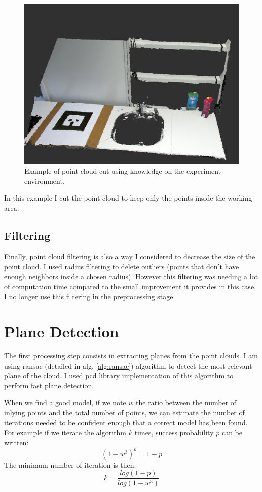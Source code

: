 \begin{figure}[h!]
\centering
\includegraphics[width=\textwidth]{images/cut.png}
\caption{Example of point cloud cut using knowledge on the experiment environment.}
\label{fig:cut}
\end{figure}

In this example I cut the point cloud to keep only the points inside the working area.

\subsection{Filtering}

Finally, point cloud filtering is also a way I considered to decrease the size of the point cloud. I used radius filtering to delete outliers (points that don’t have enough neighbors inside a chosen radius). However this filtering was needing a lot of computation time compared to the small improvement it provides in this case. I no longer use this filtering in the preprocessing stage. 

\section{Plane Detection}

The first processing step consists in extracting planes from the point clouds. I am using \acrshort{ransac} (detailed in alg. \ref{alg:ransac}) algorithm to detect the most relevant plane of the cloud. I used \acrshort{pcd} library implementation of this algorithm to perform fast plane detection.

When we find a good model, if we note $w$ the ratio between the number of inlying points and the total number of points, we can estimate the number of iterations needed to be confident enough that a correct model has been found. For example if we iterate the algorithm $k$ times, success probability $p$ can be written:
\[
    (1-w^3)^k=1-p
\]
The minimum number of iteration is then:
\[
    k=\frac{log(1-p)}{log(1-w^3)}
\]

